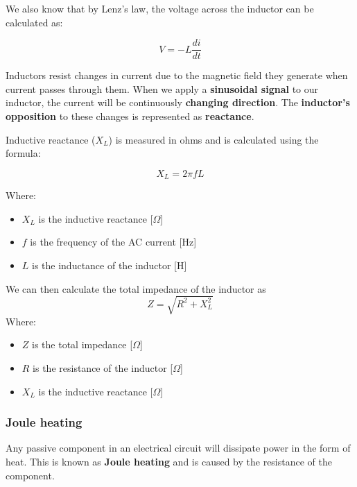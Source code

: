 We also know that by Lenz's law, the voltage across the inductor can be calculated as:

\begin{equation}
    V = -L \frac{di}{dt}
\end{equation}

Inductors resist changes in current due to the magnetic field they generate when current passes through them. When we apply a \textbf{sinusoidal signal} to our inductor, the current will be continuously \textbf{changing direction}. The \textbf{inductor's opposition} to these changes is represented as \textbf{reactance}.

Inductive reactance (\(X_L\)) is measured in ohms and is calculated using the formula:

\begin{equation}
    X_L = 2\pi fL
\end{equation}

Where:
\begin{itemize}
    \item \( X_L \) is the inductive reactance [\(\Omega\)]
    \item \( f \) is the frequency of the AC current [Hz]
    \item \( L \) is the inductance of the inductor [H]
\end{itemize}

\begin{samepage}
    We can then calculate the total impedance of the inductor as
    \nopagebreak
    \begin{equation}
        Z = \sqrt{R^2 + X_L^2}
    \end{equation}
    \nopagebreak
    Where:
    \begin{itemize}
        \item \( Z \) is the total impedance [\(\Omega\)]
        \item \( R \) is the resistance of the inductor [\(\Omega\)]
        \item \( X_L \) is the inductive reactance [\(\Omega\)]
    \end{itemize} 
\end{samepage}


\subsubsection{Joule heating}
Any passive component in an electrical circuit will dissipate power in the form of heat. This is known as \textbf{Joule heating} and is caused by the resistance of the component.

